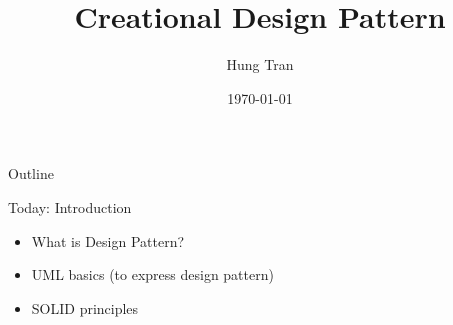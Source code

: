\documentclass[13pt]{beamer}
\title[Design Pattern]{Creational Design Pattern}
\author{Hung Tran}
\institute{Fpt software}
\date{\today}
\begin{document}
\begin{frame}
  	\titlepage
\end{frame}

\begin{frame}{Outline}
  	\tableofcontents
\end{frame}

\begin{frame}{Today: Introduction}
  	\begin{itemize}
  	\setlength\itemsep{2em} 
  	\item What is Design Pattern?
  	\item UML basics (to express design pattern)
  	\item SOLID principles
  	\end{itemize}
\end{frame}
\end{document}
